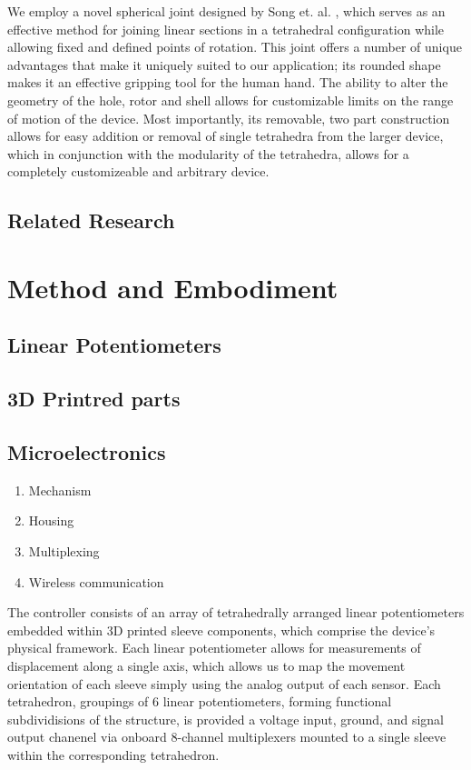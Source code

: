 \documentclass[11pt]{article}
\begin{document}
We employ a novel spherical joint designed by Song et. al. \cite{song2003spherical}, which serves as an effective method for joining linear sections in a tetrahedral configuration while allowing fixed and defined points of rotation. This joint offers a number of unique advantages that make it uniquely suited to our application; its rounded shape makes it an effective gripping tool for the human hand. The ability to alter the geometry of the hole, rotor and shell allows for customizable limits on the range of motion of the device. Most importantly, its removable, two part construction allows for easy addition or removal of single tetrahedra from the larger device, which in conjunction with the modularity of the tetrahedra, allows for a completely customizeable and arbitrary device.        
\subsection{Related Research}

\section{Method and Embodiment}
\subsection{Linear Potentiometers}
\subsection{3D Printred parts}
\subsection{Microelectronics}
 \begin{enumerate}
 \item Mechanism
 \item Housing
 \item Multiplexing
 \item Wireless communication
 \end{enumerate}

 The controller consists of an array of tetrahedrally arranged linear potentiometers embedded within 3D printed sleeve components, which comprise the device's physical framework. Each linear potentiometer allows for measurements of displacement along a single axis, which allows us to map the movement orientation of each sleeve simply using the analog output of each sensor. Each tetrahedron, groupings of 6 linear potentiometers, forming functional subdividisions of the structure, is provided a voltage input, ground, and signal output chanenel via onboard 8-channel multiplexers mounted to a single sleeve within the corresponding tetrahedron.
\end{document}
